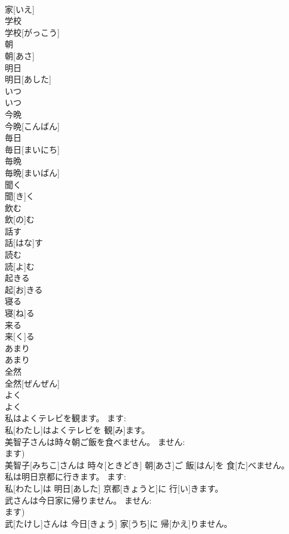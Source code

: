 \documentclass[8pt]{extreport}
\begin{document}
\begin{CJK}{UTF8}{min}
\\	家[いえ]		
\\	学校	
\\	学校[がっこう]		
\\	朝	
\\	朝[あさ]		
\\	明日	
\\	明日[あした]		
\\	いつ	
\\	いつ		
\\	今晩	
\\	今晩[こんばん]		
\\	毎日	
\\	毎日[まいにち]		
\\	毎晩	
\\	毎晩[まいばん]		
\\	聞く	
\\	聞[き]く		
\\	飲む	
\\	飲[の]む		
\\	話す	
\\	話[はな]す		
\\	読む	
\\	読[よ]む		
\\	起きる	
\\	起[お]きる		
\\	寝る	
\\	寝[ね]る		
\\	来る	
\\	来[く]る		
\\	あまり
\\	あまり
\\	全然
\\	全然[ぜんぜん]		
\\	よく	
\\	よく		
\\	私はよくテレビを観ます。	ます: 
\\	私[わたし]はよくテレビを 観[み]ます。	
\\	美智子さんは時々朝ご飯を食べません。	ません: 
\\	ます) 
\\	美智子[みちこ]さんは 時々[ときどき] 朝[あさ]ご 飯[はん]を 食[た]べません。	
\\	私は明日京都に行きます。	ます: 
\\	私[わたし]は 明日[あした] 京都[きょうと]に 行[い]きます。	
\\	武さんは今日家に帰りません。	ません: 
\\	ます) 
\\	武[たけし]さんは 今日[きょう] 家[うち]に 帰[かえ]りません。	

\end{CJK}
\end{document}
